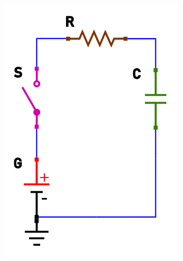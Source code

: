 \documentclass{article}
\begin{document}
\begin{figure}[h!]
  \centering
  \begin{subfigure}[b]{0.3\linewidth}
    \includegraphics[width=\linewidth]{data/carica-open.png}
  \end{subfigure}
  \begin{subfigure}[b]{0.3\linewidth}

\end{subfigure}
\end{figure}
\end{document}
